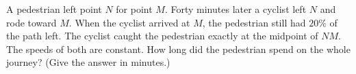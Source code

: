 A pedestrian left point $N$ for point $M$. Forty minutes later a cyclist left $N$ and rode toward $M$. When the cyclist arrived at $M$, the pedestrian still had $20\%$ of the path left. The cyclist caught the pedestrian exactly at the midpoint of $NM$. The speeds of both are constant. How long did the pedestrian spend on the whole journey? (Give the answer in minutes.)
